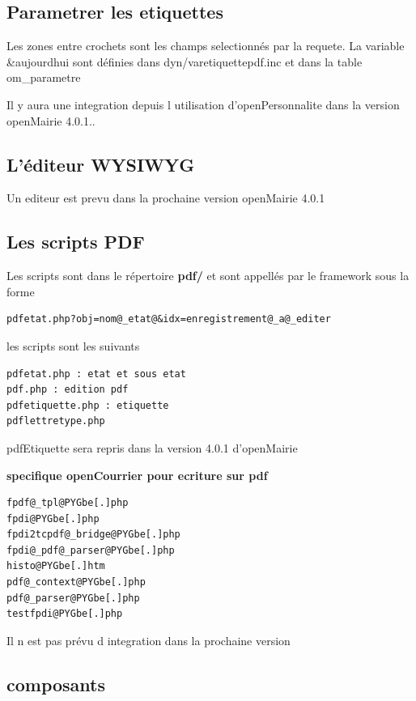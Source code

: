 \documentclass[letterpaper,10pt,french]{manual}
\begin{document}
\subsection{Parametrer les etiquettes}

Les zones entre crochets  sont les champs selectionnés par la requete.
La variable  \&aujourdhui sont définies dans dyn/varetiquettepdf.inc et dans la
table om\_parametre

Il y aura une integration depuis l utilisation d'openPersonnalite dans la version openMairie 4.0.1..


\subsection{L'éditeur WYSIWYG}

Un editeur est prevu dans la prochaine version openMairie 4.0.1


\subsection{Les scripts PDF}

Les scripts sont dans le répertoire  \textbf{pdf/} et sont  appellés par le framework sous la forme

\begin{Verbatim}[commandchars=@\[\]]
pdfetat.php?obj=nom@_etat@&idx=enregistrement@_a@_editer
\end{Verbatim}

les scripts sont les suivants

\begin{Verbatim}[commandchars=@\[\]]
pdfetat.php : etat et sous etat
pdf.php : edition pdf
pdfetiquette.php : etiquette
pdflettretype.php
\end{Verbatim}

pdfEtiquette sera repris dans la version 4.0.1 d'openMairie

\textbf{specifique openCourrier pour ecriture sur pdf}

\begin{Verbatim}[commandchars=@\[\]]
fpdf@_tpl@PYGbe[.]php
fpdi@PYGbe[.]php
fpdi2tcpdf@_bridge@PYGbe[.]php
fpdi@_pdf@_parser@PYGbe[.]php
histo@PYGbe[.]htm
pdf@_context@PYGbe[.]php
pdf@_parser@PYGbe[.]php
testfpdi@PYGbe[.]php
\end{Verbatim}

Il n est pas prévu d integration dans la prochaine version


\subsection{composants}
\end{document}
